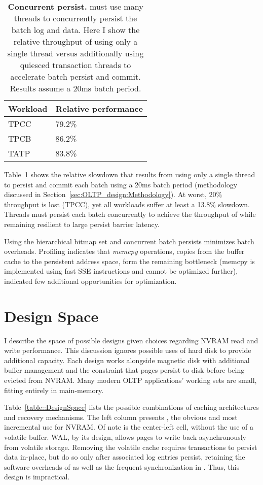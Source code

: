 \begin{table}
  \centering
  \begin{tabular}{l l}
    \hline
    Workload & Relative performance \\
    \hline \hline
    TPCC & 79.2\% \\
    TPCB & 86.2\% \\
    TATP & 83.8\% \\
    \hline
  \end{tabular}
  \caption{\textbf{Concurrent \GroupCommit persist.} \GroupCommit must use many threads to concurrently persist the batch log and data.  Here I show the relative throughput of using only a single thread versus additionally using quiesced transaction threads to accelerate batch persist and commit.  Results assume a 20ms batch period.}
  \label{table::ConcurrentPersist}
\end{table}

Table~\ref{table::ConcurrentPersist} shows the relative slowdown that results from using only a single thread to persist and commit each batch using a 20ms batch period (methodology discussed in Section~\ref{sec:OLTP_design:Methodology}).
At worst, 20\% throughput is lost (TPCC), yet all workloads suffer at least a 13.8\% slowdown.
Threads must persist each batch concurrently to achieve the throughput of \InPlace while remaining resilient to large persist barrier latency.

Using the hierarchical bitmap set and concurrent batch persists minimizes batch overheads.
Profiling indicates that \emph{memcpy} operations, copies from the buffer cache to the persistent address space, form the remaining bottleneck (memcpy is implemented using fast SSE instructions and cannot be optimized further), indicated few additional opportunities for optimization.

\section{Design Space}
\label{sec:OLTP_design:Designs}
I describe the space of possible designs given choices regarding NVRAM read and write performance.
This discussion ignores possible uses of hard disk to provide additional capacity.
Each design works alongside magnetic disk with additional buffer management and the constraint that pages persist to disk before being evicted from NVRAM.
Many modern OLTP applications' working sets are small, fitting entirely in main-memory.

Table~\ref{table::DesignSpace} lists the possible combinations of caching architectures and recovery mechanisms.
The left column presents \NVDisk, the obvious and most incremental use for NVRAM.
Of note is the center-left cell, \NVDisk without the use of a volatile buffer.
WAL, by its design, allows pages to write back asynchronously from volatile storage.
Removing the volatile cache requires transactions to persist data in-place, but do so only after associated log entries persist, retaining the software overheads of \NVDisk as well as the frequent synchronization in \InPlace.
Thus, this design is impractical.

